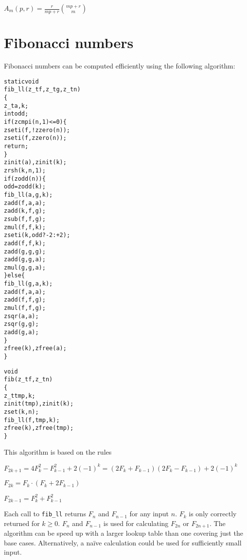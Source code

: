 \( \displaystyle{
    A_m(p, r) = \frac{r}{mp + r} \binom{mp + r}{m}
}\)


\newpage
\section{Fibonacci numbers}
\label{sec:Fibonacci numbers}

Fibonacci numbers can be computed efficiently
using the following algorithm:

\begin{alltt}
   static void
   fib_ll(z_t f, z_t g, z_t n)
   \{
       z_t a, k;
       int odd;
       if (zcmpi(n, 1) <= 0) \{
           zseti(f, !zzero(n));
           zseti(f, zzero(n));
           return;
       \}
       zinit(a), zinit(k);
       zrsh(k, n, 1);
       if (zodd(n)) \{
           odd = zodd(k);
           fib_ll(a, g, k);
           zadd(f, a, a);
           zadd(k, f, g);
           zsub(f, f, g);
           zmul(f, f, k);
           zseti(k, odd ? -2 : +2);
           zadd(f, f, k);
           zadd(g, g, g);
           zadd(g, g, a);
           zmul(g, g, a);
       \} else \{
           fib_ll(g, a, k);
           zadd(f, a, a);
           zadd(f, f, g);
           zmul(f, f, g);
           zsqr(a, a);
           zsqr(g, g);
           zadd(g, a);
       \}
       zfree(k), zfree(a);
   \}
\end{alltt}

\newpage
\begin{alltt}
   void
   fib(z_t f, z_t n)
   \{
       z_t tmp, k;
       zinit(tmp), zinit(k);
       zset(k, n);
       fib_ll(f, tmp, k);
       zfree(k), zfree(tmp);
   \}
\end{alltt}

\noindent
This algorithm is based on the rules

\vspace{1em}
\( \displaystyle{
    F_{2k + 1} = 4F_k^2 - F_{k - 1}^2 + 2(-1)^k = (2F_k + F_{k-1})(2F_k - F_{k-1}) + 2(-1)^k
}\)
\vspace{1em}

\( \displaystyle{
    F_{2k} = F_k \cdot (F_k + 2F_{k - 1})
}\)
\vspace{1em}

\( \displaystyle{
    F_{2k - 1} = F_k^2 + F_{k - 1}^2
}\)
\vspace{1em}

\noindent
Each call to {\tt fib\_ll} returns $F_n$ and $F_{n - 1}$
for any input $n$. $F_{k}$ is only correctly returned
for $k \ge 0$. $F_n$ and $F_{n - 1}$ is used for
calculating $F_{2n}$ or $F_{2n + 1}$. The algorithm
can be speed up with a larger lookup table than one
covering just the base cases. Alternatively, a naïve
calculation could be used for sufficiently small input.



